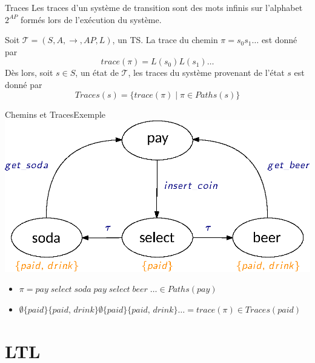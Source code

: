 \documentclass[compress]{beamer}
\begin{document}
\begin{frame}{Traces}
    Les traces d'un système de transition sont des mots infinis sur l'alphabet $2^{AP}$ formés lors de l'exécution du système. \\
\begin{definition}[Traces]
  Soit $\mathcal{T} = (S, A, \rightarrow, AP, L)$, un TS. La trace du chemin $\pi = s_0s_1 \dots$ est donné par \[trace(\pi) = L(s_0)L(s_1)\dots\]
  Dès lors, soit $s \in S$, un état de $\mathcal{T}$, les traces du système
  provenant de l'état $s$ est donné par \[Traces(s) = \{ trace(\pi) \; | \; \pi \in
  Paths(s) \}\]
\end{definition}
\end{frame}

\begin{frame}{Chemins et Traces}{Exemple}
    \centering
    \includegraphics[width=0.7\linewidth]{resources/TS.eps}
    \scriptsize
    \begin{itemize}
      \item $\pi = pay\; select \; soda \; pay \; select \; beer \; \dots \in Paths(pay)$
      \item $\emptyset\{paid\}\{paid, \, drink\}\emptyset\{paid\}\{paid, \, drink\} \dots = trace(\pi) \in Traces(paid)$
    \end{itemize}
\end{frame}

\section{LTL}
\end{document}
